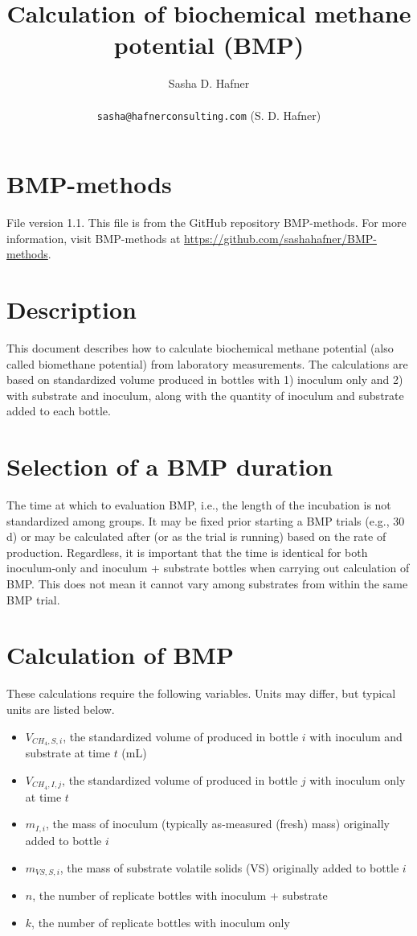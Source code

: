 \documentclass[]{article}
\title {Calculation of biochemical methane potential (BMP)}
\author{Sasha D. Hafner\\
\\
\texttt{sasha@hafnerconsulting.com} (S. D. Hafner)
}
\begin{document}
\maketitle

\section{BMP-methods}
File version 1.1. 
This file is from the GitHub repository BMP-methods.
For more information, visit BMP-methods at \url{https://github.com/sashahafner/BMP-methods}.

\section{Description}
This document describes how to calculate biochemical methane potential (also called biomethane potential) from laboratory measurements.
The calculations are based on standardized  volume produced in bottles with 1) inoculum only and 2) with substrate and inoculum, along with the quantity of inoculum and substrate added to each bottle.

\section{Selection of a BMP duration}
The time at which to evaluation BMP, i.e., the length of the incubation is not standardized among groups.
It may be fixed prior starting a BMP trials (e.g., 30 d) or may be calculated after (or as the trial is running) based on the rate of  production.
Regardless, it is important that the time is identical for both inoculum-only and inoculum + substrate bottles when carrying out calculation of BMP.
This does not mean it cannot vary among substrates from within the same BMP trial.

\section{Calculation of BMP}

These calculations require the following variables.
Units may differ, but typical units are listed below.
\begin{itemize}
  \item $V_{CH_4, S, i}$, the standardized volume of  produced in bottle $i$ with inoculum and substrate at time $t$ (mL)
  \item $V_{CH_4, I, j}$, the standardized volume of  produced in bottle $j$ with inoculum only at time $t$
  \item $m_{I, i}$, the mass of inoculum (typically as-measured (fresh) mass) originally added to bottle $i$
  \item $m_{VS, S, i}$, the mass of substrate volatile solids (VS) originally added to bottle $i$
  \item $n$, the number of replicate bottles with inoculum + substrate
  \item $k$, the number of replicate bottles with inoculum only
\end{itemize}
\end{document}
